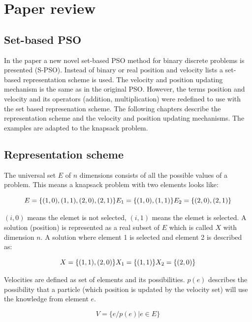 \documentclass{article}
\begin{document}
\section{Paper review}
\subsection{Set-based PSO}
In the paper \cite{bib-sets} a new novel set-based PSO method for binary discrete problems is presented (S-PSO). Instead of binary or real position and velocity lists a set-based representation scheme is used. The velocity and position updating mechanism is the same as in the original PSO. However, the terms position and velocity and its operators (addition, multiplication) were redefined to use with the set based represenation scheme. The following chapters describe the representation scheme and the velocity and position updating mechanisms. The examples are adapted to the knapsack problem.

\subsection{Representation scheme}
The universal set $E$ of $n$ dimensions consists of all the possible values of a problem. This means a knapsack problem with two elements looks like:

\begin{equation}
E = \{(1,0),(1,1),(2,0),(2,1)\}\\
E_1 = \{(1,0),(1,1)\}\\
E_2 = \{(2,0),(2,1)\}
\end{equation}

$(i,0)$ means the elemet is not selected, $(i,1)$ means the elemet is selected. A solution (position) is represented as a real subset of $E$ which is called $X$ with dimension $n$. A solution where element 1 is selected and element 2 is described as:

\begin{equation}
X = \{(1,1),(2,0)\}\\
X_1 = \{(1,1)\}\\
X_2 = \{(2,0)\}
\end{equation}

Velocities are defined as set of elements and its possibilities. $p(e)$ describes the possibility that a particle (which position is updated by the velocity set) will use the knowledge from element $e$.

\begin{equation}
V = \{e/p(e)| e \in E\}
\end{equation}
\end{document}
